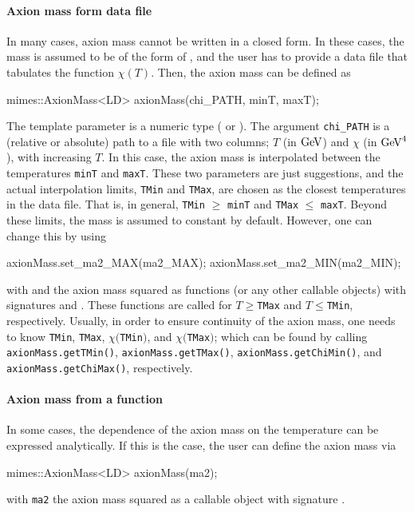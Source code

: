\documentclass[11pt,a4paper]{article}
\begin{document}
\paragraph{Axion mass form data file} 
In many cases, axion mass cannot be written in a closed form. In these cases, the mass is assumed to be of the form of , and the user has to provide a data file that tabulates the function $\chi(T)$. Then, the axion mass can be defined as
%
\begin{cpp}
	mimes::AxionMass<LD> axionMass(chi_PATH, minT, maxT);
\end{cpp}
%
The template parameter  is a numeric type (\eg {} or ). The argument  {\tt chi\_PATH} is a (relative or absolute) path to a file with two columns; $T$ (in ${\rm GeV}$) and $\chi$ (in ${\rm GeV}^4$), with increasing $T$. In this case, the axion mass is interpolated between the temperatures {\tt minT} and {\tt maxT}. These two parameters are just suggestions, and the actual interpolation limits, {\tt  TMin} and {\tt TMax}, are chosen as the closest temperatures in the data file. That is, in general, {\tt TMin} $\geq$ {\tt minT} and {\tt TMax} $\leq$ {\tt maxT}. Beyond these limits, the mass is assumed to constant by default. However, one can change this by using 
%
\begin{cpp}
	axionMass.set_ma2_MAX(ma2_MAX);
	axionMass.set_ma2_MIN(ma2_MIN);
\end{cpp}
%
with  and  the axion mass squared as functions (or any other callable objects) with signatures  and . These functions are called for $T\geq${\tt TMax} and $T\leq${\tt TMin}, respectively. Usually, in order to ensure continuity of the axion mass, one needs to know {\tt TMin}, {\tt TMax}, $\chi(${\tt TMin}$)$, and $\chi(${\tt TMax}$)$; which can be found by calling {\tt axionMass.getTMin()}, {\tt axionMass.getTMax()}, {\tt axionMass.getChiMin()}, and {\tt axionMass.getChiMax()}, respectively.

\paragraph{Axion mass from a function} 
In some cases, the dependence of the axion mass on the temperature can be expressed analytically. If this is the case, the user can define the axion mass via 
%
\begin{cpp}
	mimes::AxionMass<LD> axionMass(ma2);
\end{cpp}
%
with {\tt ma2} the axion mass squared as a callable object with signature .
\end{document}
